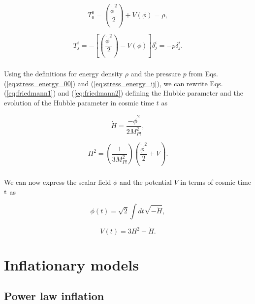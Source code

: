 \documentclass[12pt,a4paper,oneside]{book}
\begin{document}
\begin{equation}\label{eq:stress_energy_00}
T^{0}_{0} = \left(\frac{\dot{\phi}^2}{2}\right) +V(\phi) = \rho,
\end{equation}

\begin{equation}\label{eq:stress_energy_ij}
T^{i}_{j} = -\left[\left(\frac{\dot{\phi}^2}{2}\right) - V(\phi)\right]\delta^{i}_{j} = -p\delta^i_j.
\end{equation}

\paragraph*{} Using the definitions for energy density $\rho$ and the pressure 
$p$ from Eqs. (\ref{eq:stress_energy_00}) and (\ref{eq:stress_energy_ij}), 
we can rewrite Eqs. (\ref{eq:friedmann1}) and (\ref{eq:friedmann2}) defining the 
Hubble parameter and the evolution of the Hubble parameter in cosmic time $t$ as

\begin{equation}\label{eq:dH_vs_dphi}
 \dot{H} = \frac{-\dot{\phi}^2}{2M_{Pl}^2},
\end{equation}

\begin{equation}\label{eq:Hubble_parameter}
H^2 = \left(\frac{1}{3M_{Pl}^2}\right)\left(\frac{\dot{\phi}^2}{2} + V\right).
\end{equation}

\paragraph*{} We can now express the scalar field $\phi$ and the 
potential $V$ in terms of cosmic time ${\rm t}$ as

\begin{equation}\label{eq:phi_vs_H}
\phi(t)= \sqrt{2}\int dt \sqrt{-\dot{H}},
\end{equation}

\begin{equation}\label{eq:V_vs_H}
V(t) = 3H^2 + \dot{H}.
\end{equation}



\chapter{Inflationary models}

\section{Power law inflation}
\end{document}
